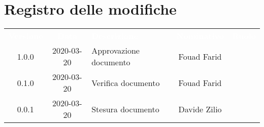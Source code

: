 \section*{Registro delle modifiche}
{
	\centering
	\begin{longtable}{ c c  C{4cm}  c  c }
		\textcolor{white}{\textbf{Versione}} & \textcolor{white}{\textbf{Data}} & \textcolor{white}{\textbf{Descrizione}} & \textcolor{white}{\textbf{Nominativo}} & \textcolor{white}{\textbf{Ruolo}}\\		
		1.0.0 & 2020-03-20 & Approvazione documento & Fouad Farid &\RdP{}\\		
		0.1.0 & 2020-03-20 & Verifica documento &  Fouad Farid &\ver{}\\		
		0.0.1 & 2020-03-20 & Stesura documento & Davide Zilio &\reda{}\\		
		
	\end{longtable}

}